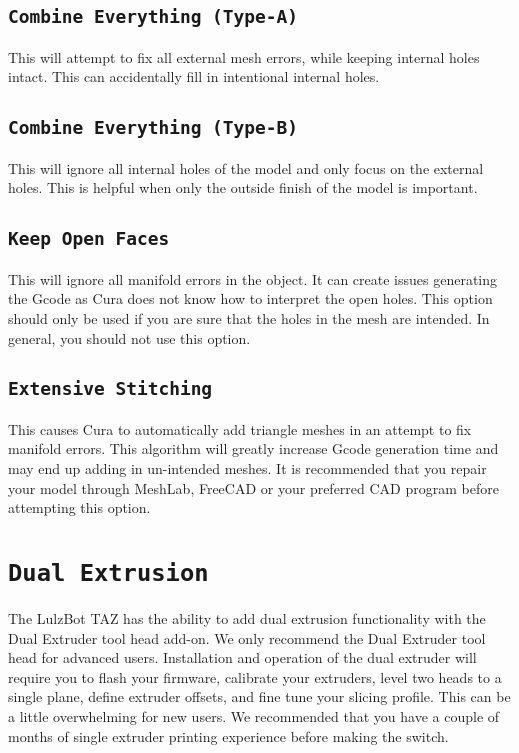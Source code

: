 \subsection{\texttt{Combine Everything (Type-A)}}
This will attempt to fix all external mesh errors, while keeping internal holes intact. This can accidentally fill in intentional internal holes.

\subsection{\texttt{Combine Everything (Type-B)}}
This will ignore all internal holes of the model and only focus on the external holes. This is helpful when only the outside finish of the model is important.

\subsection{\texttt{Keep Open Faces}}
This will ignore all manifold errors in the object. It can create issues generating the Gcode as Cura does not know how to interpret the open holes. This option should only be used if you are sure that the holes in the mesh are intended. In general, you should not use this option.

\subsection{\texttt{Extensive Stitching}}
This causes Cura to automatically add triangle meshes in an attempt to fix manifold errors. This algorithm will greatly increase Gcode generation time and may end up adding in un-intended meshes. It is recommended that you repair your model through MeshLab, FreeCAD or your preferred CAD program before attempting this option.

\section{\texttt{Dual Extrusion}}
The LulzBot TAZ has the ability to add dual extrusion functionality with the Dual Extruder tool head add-on. We only recommend the Dual Extruder tool head for advanced users. Installation and operation of the dual extruder will require you to flash your firmware, calibrate your extruders, level two heads to a single plane, define extruder offsets, and fine tune your slicing profile. This can be a little overwhelming for new users. We recommended that you have a couple of months of single extruder printing experience before making the switch.

